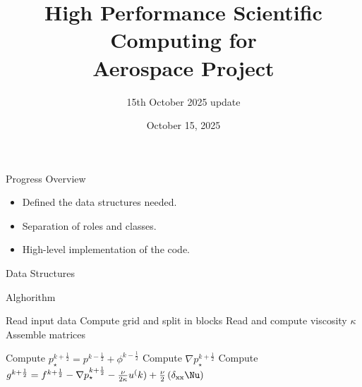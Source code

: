 \documentclass{beamer}
\title{High Performance Scientific Computing for \\ Aerospace Project}
\subtitle{15th October 2025 update}
\date{October 15, 2025}
\begin{document}
    \begin{frame}
        \maketitle
    \end{frame}



\begin{frame}{Progress Overview}
\begin{itemize}
    \item Defined the data structures needed.
    \item Separation of roles and classes.
    \item High-level implementation of the code.
\end{itemize}
\end{frame}

\begin{frame}{Data Structures}
\begin{itemize}

\end{itemize}
\end{frame}

\begin{frame}{Alghorithm}
\begin{itemize}
    \begin{algorithm}
        \caption{Pre-processing}
        \begin{algorithmic}[1]
            \State Read input data
            \State Compute grid and split in blocks
            \State Read and compute viscosity $\kappa$
            \State Assemble matrices
        \end{algorithmic}
    \end{algorithm}
    \begin{algorithm}
        \caption{Time-stepping}
        \begin{algorithmic}[1]
                \State Compute $p_\star^{k+\frac{1}{2}}=p^{k-\frac{1}{2}}+\phi^{k-\frac{1}{2}}$
                \State Compute $\nabla p_\star^{k+\frac{1}{2}}$
                \State Compute $g^{k+\frac{1}{2}}=f^{k+\frac{1}{2}}-\nabla p_\star^{k+\frac{1}{2}}-\frac{\nu}{2 \kappa}u^(k)+\frac{\nu}{2}\left(\delta_\text{xx}\Nu\right)$  
            \EndFor
        \end{algorithmic}
    \end{algorithm}
\end{itemize}
\end{frame}
\end{document}
